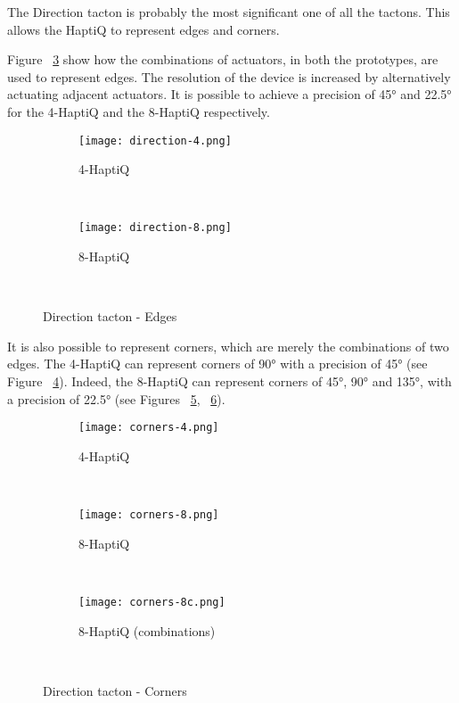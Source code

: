 The Direction tacton  is probably the most significant one of all the tactons. This allows the HaptiQ to represent edges and corners. 

Figure ~\ref{fig:edges} show how the combinations of actuators, in both the prototypes, are used to represent edges. The resolution of the device is increased by alternatively actuating adjacent actuators. It is possible to achieve a precision of 45° and 22.5° for the 4-HaptiQ and the 8-HaptiQ respectively. 

\begin{figure}[H]
        \centering
        \begin{subfigure}[H]{0.3\textwidth}
                \texttt{[image: direction-4.png]}
                \caption{4-HaptiQ}
                \label{fig:direction-4}
        \end{subfigure}%
        ~ %
        \begin{subfigure}[H]{0.5\textwidth}
                \texttt{[image: direction-8.png]}
                \caption{8-HaptiQ}
                \label{fig:direction-8}
        \end{subfigure}
        ~ %
        \caption{Direction tacton - Edges}\label{fig:edges}
\end{figure}

It is also possible to represent corners, which are merely the combinations of two edges. The 4-HaptiQ can represent corners of 90° with a precision of 45° (see Figure ~\ref{fig:corner-4}). Indeed, the 8-HaptiQ can represent corners of 45°, 90° and 135°, with a precision of 22.5° (see Figures ~\ref{fig:corner-8}, ~\ref{fig:corner-8c}). 

\begin{figure}[H]
        \centering
        \begin{subfigure}[H]{0.5\textwidth}
                \texttt{[image: corners-4.png]}
                \caption{4-HaptiQ}
                \label{fig:corner-4}
        \end{subfigure}%
        ~ %
          
        \begin{subfigure}[H]{0.4\textwidth}
                \texttt{[image: corners-8.png]}
                \caption{8-HaptiQ}
                \label{fig:corner-8}
        \end{subfigure}
        ~ 
         \begin{subfigure}[H]{0.4\textwidth}
                \texttt{[image: corners-8c.png]}
                \caption{8-HaptiQ (combinations)}
                \label{fig:corner-8c}
        \end{subfigure}
        ~ %
        \caption{Direction tacton - Corners}\label{fig:corners}
\end{figure}

